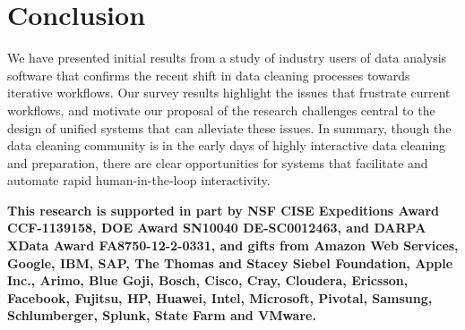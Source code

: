 \section{Conclusion}
We have presented initial results from a study of industry users of data analysis software that confirms the recent shift in data cleaning processes towards iterative workflows.
Our survey results highlight the issues that frustrate current workflows, and motivate our proposal of the research challenges central to the design of unified systems that can alleviate these issues.
In summary, though the data cleaning community is in the early days of highly interactive data cleaning and preparation, there are clear opportunities for systems that facilitate and automate rapid human-in-the-loop interactivity.

\vspace{0.5em}
\small
\textbf{This research is supported in part by NSF CISE Expeditions Award CCF-1139158, DOE Award SN10040 DE-SC0012463, and DARPA XData Award FA8750-12-2-0331, and gifts from Amazon Web Services, Google, IBM, SAP, The Thomas and Stacey Siebel Foundation, Apple Inc., Arimo, Blue Goji, Bosch, Cisco, Cray, Cloudera, Ericsson, Facebook, Fujitsu, HP, Huawei, Intel, Microsoft, Pivotal, Samsung, Schlumberger, Splunk, State Farm and VMware.}

